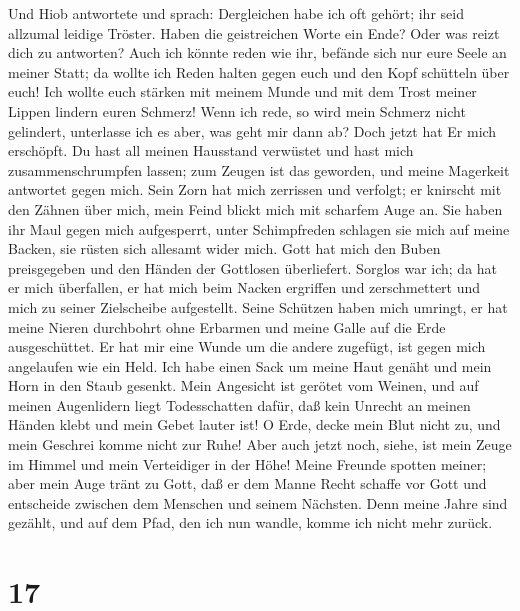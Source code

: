  Und Hiob antwortete und sprach: 
Dergleichen habe ich oft gehört; ihr seid allzumal leidige Tröster.
 Haben die geistreichen Worte ein Ende? Oder was reizt
dich zu antworten?  Auch ich könnte reden wie ihr, befände
sich nur eure Seele an meiner Statt; da wollte ich Reden halten gegen
euch und den Kopf schütteln über euch!  Ich wollte euch
stärken mit meinem Munde und mit dem Trost meiner Lippen lindern euren
Schmerz!  Wenn ich rede, so wird mein Schmerz nicht
gelindert, unterlasse ich es aber, was geht mir dann ab? 
Doch jetzt hat Er mich erschöpft. Du hast all meinen Hausstand verwüstet
 und hast mich zusammenschrumpfen lassen; zum Zeugen ist
das geworden, und meine Magerkeit antwortet gegen mich. 
Sein Zorn hat mich zerrissen und verfolgt; er knirscht mit den Zähnen
über mich, mein Feind blickt mich mit scharfem Auge an. 
Sie haben ihr Maul gegen mich aufgesperrt, unter Schimpfreden schlagen
sie mich auf meine Backen, sie rüsten sich allesamt wider mich.
 Gott hat mich den Buben preisgegeben und den Händen der
Gottlosen überliefert.  Sorglos war ich; da hat er mich
überfallen, er hat mich beim Nacken ergriffen und zerschmettert und mich
zu seiner Zielscheibe aufgestellt.  Seine Schützen haben
mich umringt, er hat meine Nieren durchbohrt ohne Erbarmen und meine
Galle auf die Erde ausgeschüttet.  Er hat mir eine Wunde
um die andere zugefügt, ist gegen mich angelaufen wie ein Held.
 Ich habe einen Sack um meine Haut genäht und mein Horn
in den Staub gesenkt.  Mein Angesicht ist gerötet vom
Weinen, und auf meinen Augenlidern liegt Todesschatten 
dafür, daß kein Unrecht an meinen Händen klebt und mein Gebet lauter
ist!  O Erde, decke mein Blut nicht zu, und mein Geschrei
komme nicht zur Ruhe!  Aber auch jetzt noch, siehe, ist
mein Zeuge im Himmel und mein Verteidiger in der Höhe! 
Meine Freunde spotten meiner; aber mein Auge tränt zu Gott,
 daß er dem Manne Recht schaffe vor Gott und entscheide
zwischen dem Menschen und seinem Nächsten.  Denn meine
Jahre sind gezählt, und auf dem Pfad, den ich nun wandle, komme ich
nicht mehr zurück.

\hypertarget{section-16}{%
\section{17}\label{section-16}}

